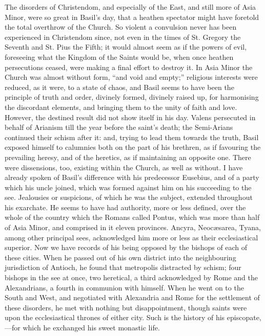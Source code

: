 The disorders of Christendom, and especially of the East, and still
more of Asia Minor, were so great in Basil's day, that a heathen
spectator might have foretold the total overthrow of the Church. So
violent a convulsion never has been experienced in Christendom since,
not even in the times of St. Gregory the Seventh and St. Pius the
Fifth; it would almost seem as if the powers of evil, foreseeing what
the Kingdom of the Saints would be, when once heathen persecutions
ceased, were making a final effort to destroy it. In Asia Minor the
Church was almost without form, ``and void and empty;''
religious interests were reduced, as it were, to a state of chaos, and
Basil seems to have been the principle of truth and order, divinely
formed, divinely raised up, for harmonising the discordant elements,
and bringing them to the unity of faith and love. However, the
destined result did not show itself in his day. Valens persecuted in
behalf of Arianism till the year before the saint's death; the
Semi-Arians continued their schism after it: and, trying to lead them
towards the truth, Basil exposed himself to calumnies both on the part
of his brethren, as if favouring the prevailing heresy, and of the
heretics, as if maintaining an opposite one. There were
dissensions, too, existing within the Church, as well as without. I
have already spoken of Basil's difference with his predecessor
Eusebius, and of a party which his uncle joined, which was formed
against him on his succeeding to the see. Jealousies or suspicions, of
which he was the subject, extended throughout his exarchate. He seems
to have had authority, more or less defined, over the whole of the
country which the Romans called Pontus, which was more than half of
Asia Minor, and comprised in it eleven provinces. Ancyra, Neocæsarea,
Tyana, among other principal sees, acknowledged him more or less as
their ecclesiastical superior. Now we have records of his being
opposed by the bishops of each of these cities. When he passed out of
his own district into the neighbouring jurisdiction of Antioch, he
found that metropolis distracted by schism; four bishops in the see at
once, two heretical, a third acknowledged by Rome and the
Alexandrians, a fourth in communion with himself. When he went on to
the South and West, and negotiated with Alexandria and Rome for the
settlement of these disorders, he met with nothing but disappointment,
though saints were upon the ecclesiastical thrones of either city.
Such is the history of his episcopate,—for which he exchanged his
sweet monastic life.

